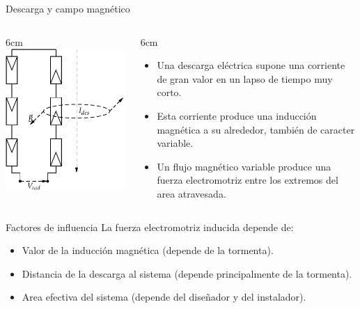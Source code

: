 \documentclass[xcolor={usenames,svgnames,dvipsnames}]{beamer}
\begin{document}
\begin{frame}[plain,label=sec-4-1-6]{Descarga y campo magnético}

\begin{columns}
\begin{column}{6cm\textwidth}
\includegraphics[height=0.8\textheight]{../figs/SobretensionInducida.pdf}
\end{column}
\begin{column}{6cm\textwidth}
\begin{itemize}
\item Una descarga eléctrica supone una corriente de gran valor en un lapso de tiempo muy corto.

\item Esta corriente produce una inducción magnética a su alrededor, también de caracter variable.

\item Un flujo magnético variable produce una fuerza electromotriz entre los extremos del area atravesada.
\end{itemize}
\end{column}
\end{columns}
\end{frame}

\begin{frame}[label=sec-4-1-7]{Factores de influencia}
La fuerza electromotriz inducida depende de:

\begin{itemize}
\item \alert{Valor de la inducción magnética} (depende de la tormenta).

\item \alert{Distancia} de la descarga al sistema (depende principalmente de la
tormenta).

\item \alert{Area efectiva del sistema} (depende del diseñador y del instalador).
\end{itemize}
\end{frame}
\end{document}
